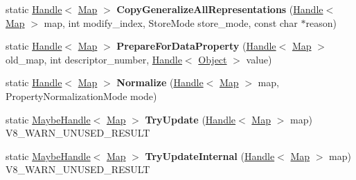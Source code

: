 \begin{DoxyCompactItemize}
\item 
\hypertarget{classv8_1_1internal_1_1_map_a553e450c0f62bcad8ddf7e662062fe3d}{}static \hyperlink{classv8_1_1internal_1_1_handle}{Handle}$<$ \hyperlink{classv8_1_1internal_1_1_map}{Map} $>$ {\bfseries Copy\+Generalize\+All\+Representations} (\hyperlink{classv8_1_1internal_1_1_handle}{Handle}$<$ \hyperlink{classv8_1_1internal_1_1_map}{Map} $>$ map, int modify\+\_\+index, Store\+Mode store\+\_\+mode, const char $\ast$reason)\label{classv8_1_1internal_1_1_map_a553e450c0f62bcad8ddf7e662062fe3d}

\item 
\hypertarget{classv8_1_1internal_1_1_map_a7fabe82dd0314c8bafd3d796dc0d7922}{}static \hyperlink{classv8_1_1internal_1_1_handle}{Handle}$<$ \hyperlink{classv8_1_1internal_1_1_map}{Map} $>$ {\bfseries Prepare\+For\+Data\+Property} (\hyperlink{classv8_1_1internal_1_1_handle}{Handle}$<$ \hyperlink{classv8_1_1internal_1_1_map}{Map} $>$ old\+\_\+map, int descriptor\+\_\+number, \hyperlink{classv8_1_1internal_1_1_handle}{Handle}$<$ \hyperlink{classv8_1_1internal_1_1_object}{Object} $>$ value)\label{classv8_1_1internal_1_1_map_a7fabe82dd0314c8bafd3d796dc0d7922}

\item 
\hypertarget{classv8_1_1internal_1_1_map_a887f1c1a1b994a6371e9ceb4cac39651}{}static \hyperlink{classv8_1_1internal_1_1_handle}{Handle}$<$ \hyperlink{classv8_1_1internal_1_1_map}{Map} $>$ {\bfseries Normalize} (\hyperlink{classv8_1_1internal_1_1_handle}{Handle}$<$ \hyperlink{classv8_1_1internal_1_1_map}{Map} $>$ map, Property\+Normalization\+Mode mode)\label{classv8_1_1internal_1_1_map_a887f1c1a1b994a6371e9ceb4cac39651}

\item 
\hypertarget{classv8_1_1internal_1_1_map_a0833a288c4f0680e86a0a82d587ad203}{}static \hyperlink{classv8_1_1internal_1_1_maybe_handle}{Maybe\+Handle}$<$ \hyperlink{classv8_1_1internal_1_1_map}{Map} $>$ {\bfseries Try\+Update} (\hyperlink{classv8_1_1internal_1_1_handle}{Handle}$<$ \hyperlink{classv8_1_1internal_1_1_map}{Map} $>$ map) V8\+\_\+\+W\+A\+R\+N\+\_\+\+U\+N\+U\+S\+E\+D\+\_\+\+R\+E\+S\+U\+L\+T\label{classv8_1_1internal_1_1_map_a0833a288c4f0680e86a0a82d587ad203}

\item 
\hypertarget{classv8_1_1internal_1_1_map_a3ee54c997595d1a2d1108f1fb3f1f4ac}{}static \hyperlink{classv8_1_1internal_1_1_maybe_handle}{Maybe\+Handle}$<$ \hyperlink{classv8_1_1internal_1_1_map}{Map} $>$ {\bfseries Try\+Update\+Internal} (\hyperlink{classv8_1_1internal_1_1_handle}{Handle}$<$ \hyperlink{classv8_1_1internal_1_1_map}{Map} $>$ map) V8\+\_\+\+W\+A\+R\+N\+\_\+\+U\+N\+U\+S\+E\+D\+\_\+\+R\+E\+S\+U\+L\+T\label{classv8_1_1internal_1_1_map_a3ee54c997595d1a2d1108f1fb3f1f4ac}


\end{DoxyCompactItemize}

